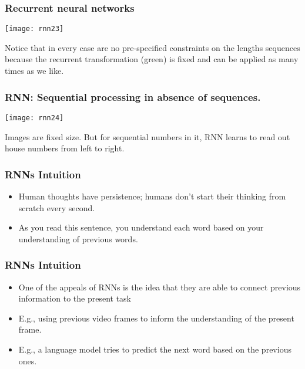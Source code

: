 \begin{frame}[fragile] \frametitle{Recurrent neural networks}
\begin{center}
\texttt{[image: rnn23]}
\end{center}
Notice that in every case are no pre-specified constraints on the lengths sequences because the recurrent transformation (green) is fixed and can be applied as many times as we like.
\end{frame}



\begin{frame}[fragile] \frametitle{RNN: Sequential processing in absence of sequences.}
\begin{center}
\texttt{[image: rnn24]}
\end{center}
Images are fixed size. But for sequential numbers in it, RNN learns to read out house numbers from left to right.
\end{frame}










\begin{frame}[fragile] \frametitle{RNNs Intuition}

\begin{itemize}
\item Human thoughts have persistence; humans don't start their thinking from scratch every second. 
\item As you read this sentence, you understand each word based on your understanding of previous words.  
\end{itemize}
\end{frame}

\begin{frame}[fragile] \frametitle{RNNs Intuition}

\begin{itemize}
\item One of the appeals of RNNs is the idea that they are able to connect previous information to the present task
\item E.g., using previous video frames to inform the understanding of the present frame.
\item E.g., a language model tries to predict the next word based on the previous ones.
\end{itemize}
\end{frame}


